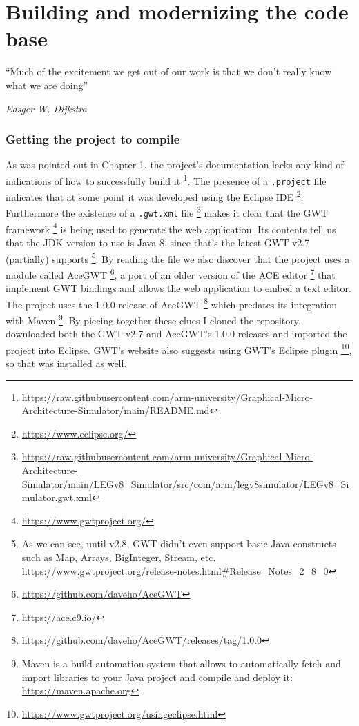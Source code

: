\chapter{Building and modernizing the code base}\label{chap:chap2}

\epigraph{``Much of the excitement we get out of our work is that we don't really know what we are doing''}{\textit{Edsger W. Dijkstra}}

\subsection*{Getting the project to compile}

As was pointed out in Chapter 1, the project's documentation lacks any kind of indications of how to successfully build it \footnote{\url{https://raw.githubusercontent.com/arm-university/Graphical-Micro-Architecture-Simulator/main/README.md}}.
The presence of a \verb|.project| file indicates that at some point it was developed using the Eclipse IDE \footnote{\url{https://www.eclipse.org/}}. Furthermore the existence of a \verb|.gwt.xml| file \footnote{\url{https://raw.githubusercontent.com/arm-university/Graphical-Micro-Architecture-Simulator/main/LEGv8_Simulator/src/com/arm/legv8simulator/LEGv8_Simulator.gwt.xml}} makes it clear that the GWT framework \footnote{\url{https://www.gwtproject.org/}} is being used to generate the web application. Its contents tell us that the JDK version to use is Java 8, since that's the latest GWT v2.7 (partially) supports \footnote{As we can see, until v2.8, GWT didn't even support basic Java constructs such as Map, Arrays, BigInteger, Stream, etc. \url{https://www.gwtproject.org/release-notes.html#Release_Notes_2_8_0}}. By reading the file we also discover that the project uses a module called AceGWT \footnote{\url{https://github.com/daveho/AceGWT}}, a port of an older version of the ACE editor \footnote{\url{https://ace.c9.io/}} that implement GWT bindings and allows the web application to embed a text editor. The project uses the 1.0.0 release of AceGWT \footnote{\url{https://github.com/daveho/AceGWT/releases/tag/1.0.0}} which predates its integration with Maven \footnote{Maven is a build automation system that allows to automatically fetch and import libraries to your Java project and compile and deploy it: \url{https://maven.apache.org}}.
\newline
By piecing together these clues I cloned the repository, downloaded both the GWT v2.7 and AceGWT's 1.0.0 releases and imported the project into Eclipse. GWT's website also suggests using GWT's Eclipse plugin \footnote{\url{https://www.gwtproject.org/usingeclipse.html}}, so that was installed as well.
